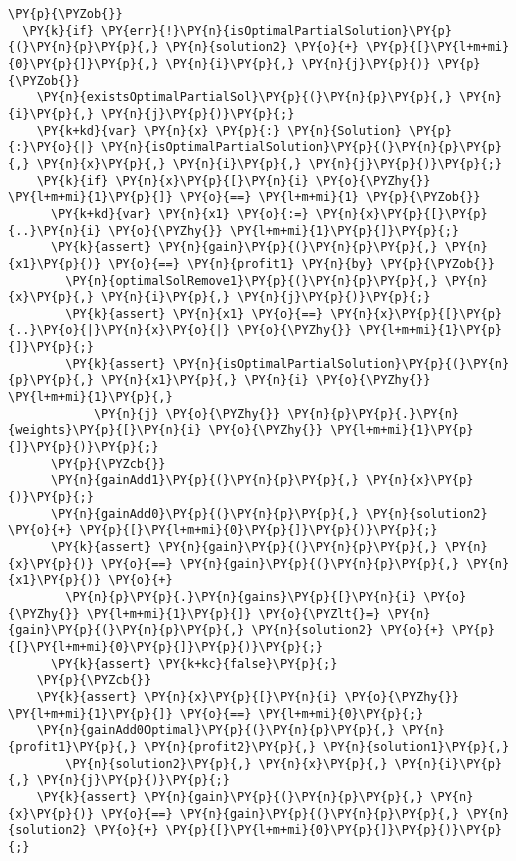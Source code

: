 \begin{sloppypar}
\begin{Verbatim}[commandchars=\\\{\}]
\PY{p}{\PYZob{}}
  \PY{k}{if} \PY{err}{!}\PY{n}{isOptimalPartialSolution}\PY{p}{(}\PY{n}{p}\PY{p}{,} \PY{n}{solution2} \PY{o}{+} \PY{p}{[}\PY{l+m+mi}{0}\PY{p}{]}\PY{p}{,} \PY{n}{i}\PY{p}{,} \PY{n}{j}\PY{p}{)} \PY{p}{\PYZob{}}
    \PY{n}{existsOptimalPartialSol}\PY{p}{(}\PY{n}{p}\PY{p}{,} \PY{n}{i}\PY{p}{,} \PY{n}{j}\PY{p}{)}\PY{p}{;}
    \PY{k+kd}{var} \PY{n}{x} \PY{p}{:} \PY{n}{Solution} \PY{p}{:}\PY{o}{|} \PY{n}{isOptimalPartialSolution}\PY{p}{(}\PY{n}{p}\PY{p}{,} \PY{n}{x}\PY{p}{,} \PY{n}{i}\PY{p}{,} \PY{n}{j}\PY{p}{)}\PY{p}{;}
    \PY{k}{if} \PY{n}{x}\PY{p}{[}\PY{n}{i} \PY{o}{\PYZhy{}} \PY{l+m+mi}{1}\PY{p}{]} \PY{o}{==} \PY{l+m+mi}{1} \PY{p}{\PYZob{}}
      \PY{k+kd}{var} \PY{n}{x1} \PY{o}{:=} \PY{n}{x}\PY{p}{[}\PY{p}{..}\PY{n}{i} \PY{o}{\PYZhy{}} \PY{l+m+mi}{1}\PY{p}{]}\PY{p}{;}
      \PY{k}{assert} \PY{n}{gain}\PY{p}{(}\PY{n}{p}\PY{p}{,} \PY{n}{x1}\PY{p}{)} \PY{o}{==} \PY{n}{profit1} \PY{n}{by} \PY{p}{\PYZob{}}
        \PY{n}{optimalSolRemove1}\PY{p}{(}\PY{n}{p}\PY{p}{,} \PY{n}{x}\PY{p}{,} \PY{n}{i}\PY{p}{,} \PY{n}{j}\PY{p}{)}\PY{p}{;}
        \PY{k}{assert} \PY{n}{x1} \PY{o}{==} \PY{n}{x}\PY{p}{[}\PY{p}{..}\PY{o}{|}\PY{n}{x}\PY{o}{|} \PY{o}{\PYZhy{}} \PY{l+m+mi}{1}\PY{p}{]}\PY{p}{;}
        \PY{k}{assert} \PY{n}{isOptimalPartialSolution}\PY{p}{(}\PY{n}{p}\PY{p}{,} \PY{n}{x1}\PY{p}{,} \PY{n}{i} \PY{o}{\PYZhy{}} \PY{l+m+mi}{1}\PY{p}{,} 
            \PY{n}{j} \PY{o}{\PYZhy{}} \PY{n}{p}\PY{p}{.}\PY{n}{weights}\PY{p}{[}\PY{n}{i} \PY{o}{\PYZhy{}} \PY{l+m+mi}{1}\PY{p}{]}\PY{p}{)}\PY{p}{;}
      \PY{p}{\PYZcb{}}
      \PY{n}{gainAdd1}\PY{p}{(}\PY{n}{p}\PY{p}{,} \PY{n}{x}\PY{p}{)}\PY{p}{;}
      \PY{n}{gainAdd0}\PY{p}{(}\PY{n}{p}\PY{p}{,} \PY{n}{solution2} \PY{o}{+} \PY{p}{[}\PY{l+m+mi}{0}\PY{p}{]}\PY{p}{)}\PY{p}{;}
      \PY{k}{assert} \PY{n}{gain}\PY{p}{(}\PY{n}{p}\PY{p}{,} \PY{n}{x}\PY{p}{)} \PY{o}{==} \PY{n}{gain}\PY{p}{(}\PY{n}{p}\PY{p}{,} \PY{n}{x1}\PY{p}{)} \PY{o}{+} 
        \PY{n}{p}\PY{p}{.}\PY{n}{gains}\PY{p}{[}\PY{n}{i} \PY{o}{\PYZhy{}} \PY{l+m+mi}{1}\PY{p}{]} \PY{o}{\PYZlt{}=} \PY{n}{gain}\PY{p}{(}\PY{n}{p}\PY{p}{,} \PY{n}{solution2} \PY{o}{+} \PY{p}{[}\PY{l+m+mi}{0}\PY{p}{]}\PY{p}{)}\PY{p}{;}
      \PY{k}{assert} \PY{k+kc}{false}\PY{p}{;}
    \PY{p}{\PYZcb{}}
    \PY{k}{assert} \PY{n}{x}\PY{p}{[}\PY{n}{i} \PY{o}{\PYZhy{}} \PY{l+m+mi}{1}\PY{p}{]} \PY{o}{==} \PY{l+m+mi}{0}\PY{p}{;}
    \PY{n}{gainAdd0Optimal}\PY{p}{(}\PY{n}{p}\PY{p}{,} \PY{n}{profit1}\PY{p}{,} \PY{n}{profit2}\PY{p}{,} \PY{n}{solution1}\PY{p}{,} 
        \PY{n}{solution2}\PY{p}{,} \PY{n}{x}\PY{p}{,} \PY{n}{i}\PY{p}{,} \PY{n}{j}\PY{p}{)}\PY{p}{;}
    \PY{k}{assert} \PY{n}{gain}\PY{p}{(}\PY{n}{p}\PY{p}{,} \PY{n}{x}\PY{p}{)} \PY{o}{==} \PY{n}{gain}\PY{p}{(}\PY{n}{p}\PY{p}{,} \PY{n}{solution2} \PY{o}{+} \PY{p}{[}\PY{l+m+mi}{0}\PY{p}{]}\PY{p}{)}\PY{p}{;}

\end{Verbatim}
\end{sloppypar}
